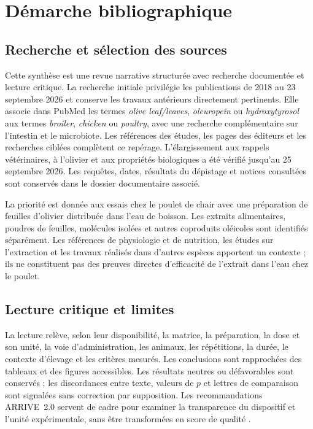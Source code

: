 \section{Démarche bibliographique}

\subsection{Recherche et sélection des sources}

Cette synthèse est une revue narrative structurée avec recherche documentée et lecture critique. La recherche initiale privilégie les publications de 2018 au 23 septembre 2026 et conserve les travaux antérieurs directement pertinents. Elle associe dans PubMed les termes \textit{olive leaf/leaves}, \textit{oleuropein} ou \textit{hydroxytyrosol} aux termes \textit{broiler}, \textit{chicken} ou \textit{poultry}, avec une recherche complémentaire sur l'intestin et le microbiote. Les références des études, les pages des éditeurs et les recherches ciblées complètent ce repérage. L'élargissement aux rappels vétérinaires, à l'olivier et aux propriétés biologiques a été vérifié jusqu'au 25 septembre 2026. Les requêtes, dates, résultats du dépistage et notices consultées sont conservés dans le dossier documentaire associé.

La priorité est donnée aux essais chez le poulet de chair avec une préparation de feuilles d'olivier distribuée dans l'eau de boisson. Les extraits alimentaires, poudres de feuilles, molécules isolées et autres coproduits oléicoles sont identifiés séparément. Les références de physiologie et de nutrition, les études sur l'extraction et les travaux réalisés dans d'autres espèces apportent un contexte ; ils ne constituent pas des preuves directes d'efficacité de l'extrait dans l'eau chez le poulet.

\subsection{Lecture critique et limites}

La lecture relève, selon leur disponibilité, la matrice, la préparation, la dose et son unité, la voie d'administration, les animaux, les répétitions, la durée, le contexte d'élevage et les critères mesurés. Les conclusions sont rapprochées des tableaux et des figures accessibles. Les résultats neutres ou défavorables sont conservés ; les discordances entre texte, valeurs de \(p\) et lettres de comparaison sont signalées sans correction par supposition. Les recommandations ARRIVE~2.0 servent de cadre pour examiner la transparence du dispositif et l'unité expérimentale, sans être transformées en score de qualité \citep{PercieduSert2020}.

